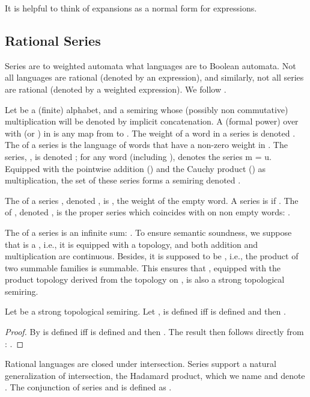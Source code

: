 \documentclass[a4paper,USenglish]{lipics}
\begin{document}
It is helpful to think of expansions as a normal form for expressions.

\subsection{Rational Series}

Series are to weighted automata what languages are to Boolean automata.  Not
all languages are rational (denoted by an expression), and similarly, not
all series are rational (denoted by a weighted expression).  We follow
\citet{sakarovitch.09.eat}.

Let  be a (finite) alphabet, and  a
semiring whose (possibly non commutative) multiplication will be denoted by
implicit concatenation.  A (formal power)  over  with
 (or ) in  is any map from  to
.  The weight of a word  in a series  is denoted .  The
 of a series  is the language of words that have a non-zero
weight in .  The  series, , is denoted ;
for any word  (including ),  denotes the series
m = u.  Equipped with
the pointwise addition () and the
Cauchy product
()
as multiplication, the set of these series forms a semiring denoted
.

The  of a series , denoted , is ,
the weight of the empty word.  A series  is  if
. The  of , denoted , is the
proper series which coincides with  on non empty words:
.

The  of a series is an infinite sum: .
To ensure semantic soundness, we suppose that  is a
, i.e., it is equipped with a topology, and both
addition and multiplication are continuous.  Besides, it is supposed to be
, i.e., the product of two summable families is summable.  This
ensures that , equipped with the product topology derived from the
topology on , is also a strong topological semiring.

\begin{Proposition}
  \label{prop:dev}
  Let  be a strong topological semiring. Let ,
 is defined iff  is defined and then
  .
\end{Proposition}
\begin{proof}
  By \citep[Prop.~2.6, p.~396]{sakarovitch.09.eat}  is defined iff
   is defined and then
  .  The
  result then follows directly from :
  .
\end{proof}

Rational languages are closed under intersection.  Series support a natural
generalization of intersection, the Hadamard product, which we name
 and denote .  The conjunction of series  and  is
defined as .
\end{document}
